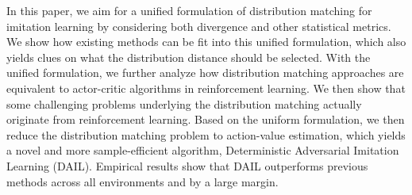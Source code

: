 In this paper, we aim for a unified formulation of distribution matching for imitation learning by considering both divergence and other statistical metrics.  
We show how existing methods can be fit into this unified formulation, 
which also yields clues on what the distribution distance should be selected. 
With the unified formulation, we further analyze how distribution matching approaches are equivalent to actor-critic algorithms in reinforcement learning. 
We then show that some challenging problems underlying the distribution matching actually originate from reinforcement learning. 
Based on the uniform formulation, we then reduce the distribution matching problem to action-value estimation, which yields a novel and more sample-efficient algorithm, Deterministic Adversarial Imitation Learning (DAIL). 
Empirical results show that DAIL outperforms previous methods across all environments and by a large margin. 
